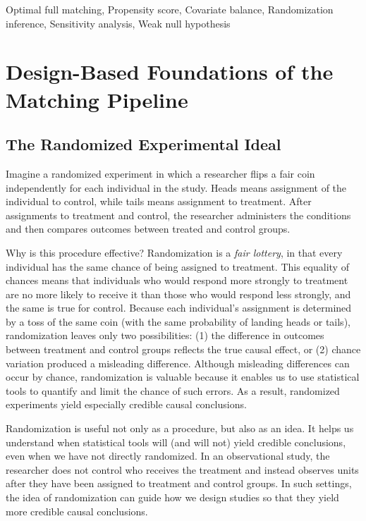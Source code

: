 \documentclass[twoside,11pt]{article}
\begin{document}
\begin{keywords}
  Optimal full matching, Propensity score, Covariate balance, Randomization inference, Sensitivity analysis, Weak null hypothesis
\end{keywords}


\section{Design-Based Foundations of the Matching
Pipeline}\label{design-based-foundations-of-the-matching-pipeline}

\subsection{The Randomized Experimental
Ideal}\label{the-randomized-experimental-ideal}

Imagine a randomized experiment in which a researcher flips a fair coin
independently for each individual in the study. Heads means assignment
of the individual to control, while tails means assignment to treatment.
After assignments to treatment and control, the researcher administers
the conditions and then compares outcomes between treated and control
groups.

Why is this procedure effective? Randomization is a \emph{fair lottery}, in that
every individual has the same chance of being assigned to treatment.
This equality of chances means that individuals who would respond more strongly to treatment
are no more likely to receive it than those who would respond less
strongly, and the same is true for control. Because each individual's
assignment is determined by a toss of the same coin (with the same
probability of landing heads or tails), randomization leaves only two
possibilities: (1) the difference in outcomes between treatment and
control groups reflects the true causal effect, or (2) chance variation
produced a misleading difference. Although misleading differences can
occur by chance, randomization is valuable because it enables us to use
statistical tools to quantify and limit the chance of such errors. As a
result, randomized experiments yield especially credible causal
conclusions.

Randomization is useful not only as a procedure, but also as an idea. It
helps us understand when statistical tools will (and will not) yield
credible conclusions, even when we have not directly randomized. In an
observational study, the researcher does not control who receives the
treatment and instead observes units after they have been assigned to
treatment and control groups. In such settings, the idea of
randomization can guide how we design studies so that they yield more
credible causal conclusions.
\end{document}
